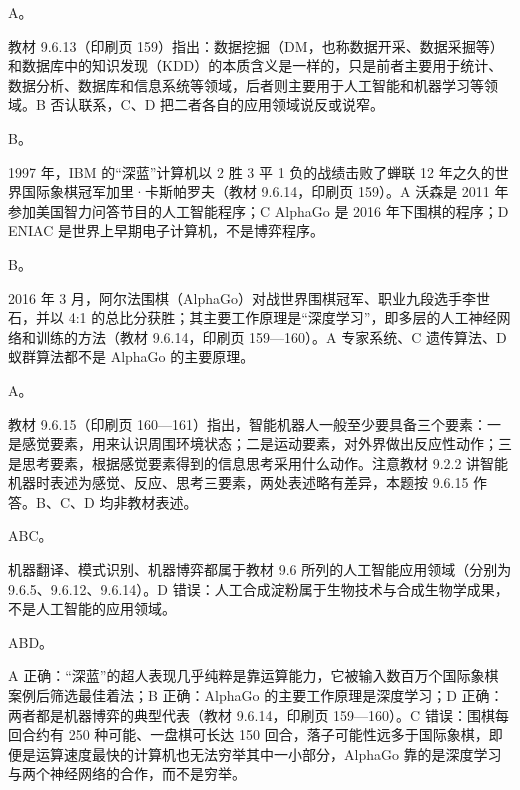 \documentclass[a4paper,11pt]{article}
\begin{document}
\q A。\begin{analysis}教材 9.6.13（印刷页 159）指出：数据挖掘（DM，也称数据开采、数据采掘等）和数据库中的知识发现（KDD）的本质含义是一样的，只是前者主要用于统计、数据分析、数据库和信息系统等领域，后者则主要用于人工智能和机器学习等领域。B 否认联系，C、D 把二者各自的应用领域说反或说窄。\end{analysis}

\q B。\begin{analysis}1997 年，IBM 的“深蓝”计算机以 2 胜 3 平 1 负的战绩击败了蝉联 12 年之久的世界国际象棋冠军加里·卡斯帕罗夫（教材 9.6.14，印刷页 159）。A 沃森是 2011 年参加美国智力问答节目的人工智能程序；C AlphaGo 是 2016 年下围棋的程序；D ENIAC 是世界上早期电子计算机，不是博弈程序。\end{analysis}

\q B。\begin{analysis}2016 年 3 月，阿尔法围棋（AlphaGo）对战世界围棋冠军、职业九段选手李世石，并以 4:1 的总比分获胜；其主要工作原理是“深度学习”，即多层的人工神经网络和训练的方法（教材 9.6.14，印刷页 159—160）。A 专家系统、C 遗传算法、D 蚁群算法都不是 AlphaGo 的主要原理。\end{analysis}

\q A。\begin{analysis}教材 9.6.15（印刷页 160—161）指出，智能机器人一般至少要具备三个要素：一是感觉要素，用来认识周围环境状态；二是运动要素，对外界做出反应性动作；三是思考要素，根据感觉要素得到的信息思考采用什么动作。注意教材 9.2.2 讲智能机器时表述为感觉、反应、思考三要素，两处表述略有差异，本题按 9.6.15 作答。B、C、D 均非教材表述。\end{analysis}


\q ABC。\begin{analysis}机器翻译、模式识别、机器博弈都属于教材 9.6 所列的人工智能应用领域（分别为 9.6.5、9.6.12、9.6.14）。D 错误：人工合成淀粉属于生物技术与合成生物学成果，不是人工智能的应用领域。\end{analysis}

\q ABD。\begin{analysis}A 正确：“深蓝”的超人表现几乎纯粹是靠运算能力，它被输入数百万个国际象棋案例后筛选最佳着法；B 正确：AlphaGo 的主要工作原理是深度学习；D 正确：两者都是机器博弈的典型代表（教材 9.6.14，印刷页 159—160）。C 错误：围棋每回合约有 250 种可能、一盘棋可长达 150 回合，落子可能性远多于国际象棋，即便是运算速度最快的计算机也无法穷举其中一小部分，AlphaGo 靠的是深度学习与两个神经网络的合作，而不是穷举。\end{analysis}
\end{document}
